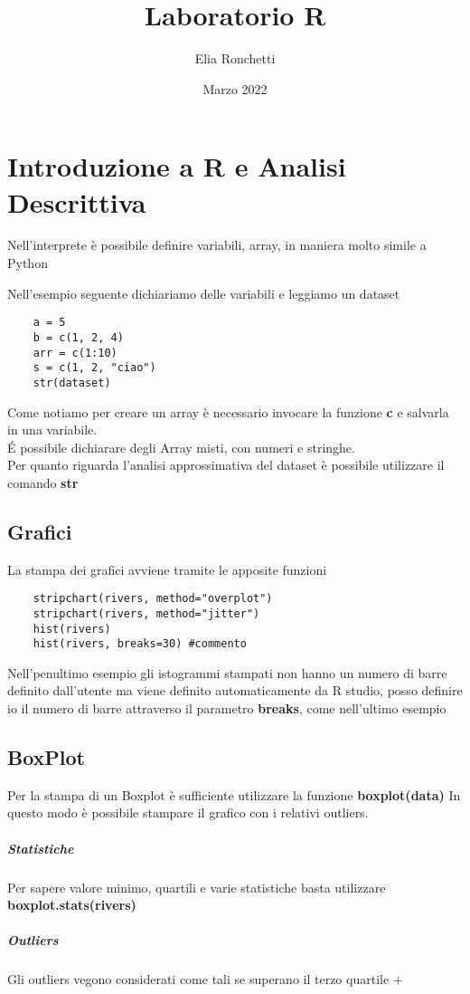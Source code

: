 \documentclass[12pt, a4paper, openany]{book}
\begin{document}
\title{Laboratorio R}
\author{Elia Ronchetti}
\date{Marzo 2022}

\maketitle
\tableofcontents
\chapter{Introduzione a R e Analisi Descrittiva}
Nell'interprete è possibile definire variabili, array, in maniera molto simile
a Python

Nell'esempio seguente dichiariamo delle variabili e leggiamo un dataset
\begin{lstlisting}
    a = 5
    b = c(1, 2, 4)
    arr = c(1:10)
    s = c(1, 2, "ciao")
    str(dataset)
\end{lstlisting}


Come notiamo per creare un array è necessario invocare la funzione \textbf{c} e salvarla in una variabile.
\\ \'E possibile dichiarare degli Array misti, con numeri e stringhe.
\\ Per quanto riguarda l'analisi approssimativa del dataset è possibile utilizzare il
comando \textbf{str}

\section{Grafici}
La stampa dei grafici avviene tramite le apposite funzioni
\begin{lstlisting}
    stripchart(rivers, method="overplot")
    stripchart(rivers, method="jitter")
    hist(rivers)
    hist(rivers, breaks=30) #commento
\end{lstlisting}
Nell'penultimo esempio gli istogrammi stampati non hanno un numero di barre definito dall'utente
ma viene definito automaticamente da R studio, posso definire io il numero di barre attraverso
il parametro \textbf{breaks}, come nell'ultimo esempio 

\section{BoxPlot}
Per la stampa di un Boxplot è sufficiente utilizzare la funzione \textbf{boxplot(data)}
In questo modo è possibile stampare il grafico con i relativi outliers.
\paragraph{Statistiche} Per sapere valore minimo, quartili e varie statistiche basta utilizzare
\textbf{boxplot.stats(rivers)}
\paragraph{Outliers} Gli outliers vegono considerati come tali se superano il terzo quartile
+ 
\end{document}
